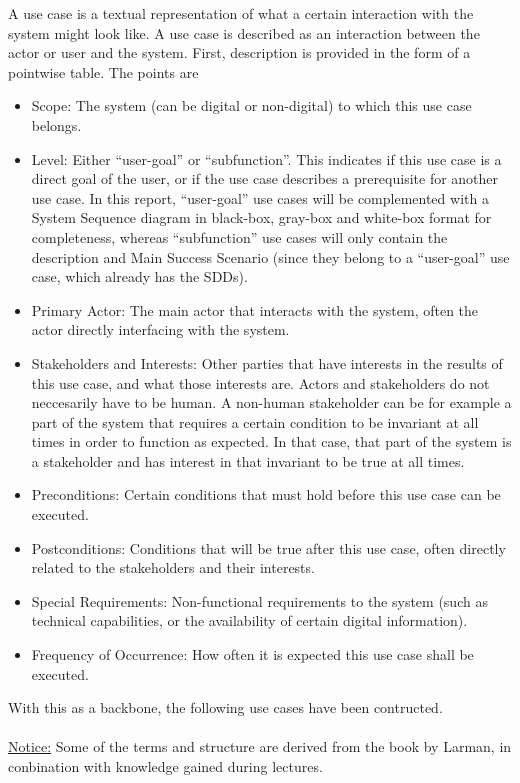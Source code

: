A use case is a textual representation of what a certain interaction with the system might look like. A use case is described as an interaction between the actor or user and the system. First, description is provided in the form of a pointwise table. The points are
\begin{itemize}
	\item Scope: The system (can be digital or non-digital) to which this use case belongs.
	\item Level: Either ``user-goal'' or ``subfunction''. This indicates if this use case is a direct goal of the user, or if the use case describes a prerequisite for another use case. In this report, ``user-goal'' use cases will be complemented with a System Sequence diagram in black-box, gray-box and white-box format for completeness, whereas ``subfunction'' use cases will only contain the description and Main Success Scenario (since they belong to a ``user-goal'' use case, which already has the SDDs).
	\item Primary Actor: The main actor that interacts with the system, often the actor directly interfacing with the system.
	\item Stakeholders and Interests: Other parties that have interests in the results of this use case, and what those interests are. Actors and stakeholders do not neccesarily have to be human. A non-human stakeholder can be for example a part of the system that requires a certain condition to be invariant at all times in order to function as expected. In that case, that part of the system is a stakeholder and has interest in that invariant to be true at all times.
	\item Preconditions: Certain conditions that must hold before this use case can be executed.
	\item Postconditions: Conditions that will be true after this use case, often directly related to the stakeholders and their interests.
	\item Special Requirements: Non-functional requirements to the system (such as technical capabilities, or the availability of certain digital information).
	\item Frequency of Occurrence: How often it is expected this use case shall be executed.
\end{itemize}
With this as a backbone, the following use cases have been contructed.\\\\

\underline{Notice:} Some of the terms and structure are derived from the book by Larman, in conbination with knowledge gained during lectures.